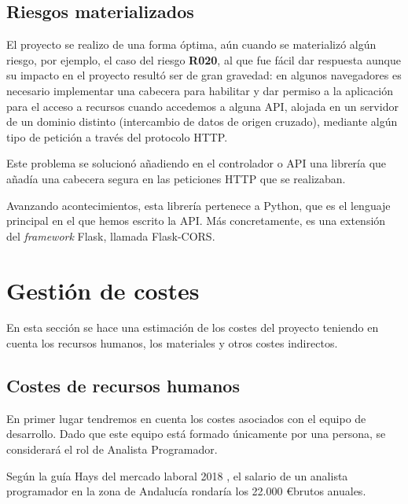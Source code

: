 \subsection{Riesgos materializados}

El proyecto se realizo de una forma óptima, aún cuando se materializó algún riesgo, por ejemplo, el caso del riesgo \textbf{R020}, al que fue fácil dar respuesta aunque su impacto en el proyecto resultó ser de gran gravedad: en algunos navegadores es necesario implementar una cabecera para habilitar y dar permiso a la aplicación para el acceso a recursos cuando accedemos a alguna API, alojada en un servidor de un dominio distinto (intercambio de datos de origen cruzado), mediante algún tipo de petición a través del protocolo HTTP\cite{cors}.

Este problema se solucionó añadiendo en el controlador o API una librería que añadía una cabecera segura en las peticiones HTTP que se realizaban\cite{corsflask}.

Avanzando acontecimientos, esta librería pertenece a Python, que es el lenguaje principal en el que hemos escrito la API. Más concretamente, es una extensión del \textit{framework} Flask, llamada Flask-CORS\cite{corsflask2}.

\section{Gestión de costes}

En esta sección se hace una estimación de los costes del proyecto teniendo en cuenta los recursos humanos, los materiales y otros costes indirectos.

\subsection{Costes de recursos humanos}

En primer lugar tendremos en cuenta los costes asociados con el equipo de desarrollo. Dado que este equipo está formado únicamente por una persona, se considerará el rol de Analista Programador.

Según la guía Hays del mercado laboral 2018 \cite{guiahays}, el salario de un analista programador en la zona de Andalucía rondaría los 22.000 \euro brutos anuales.

